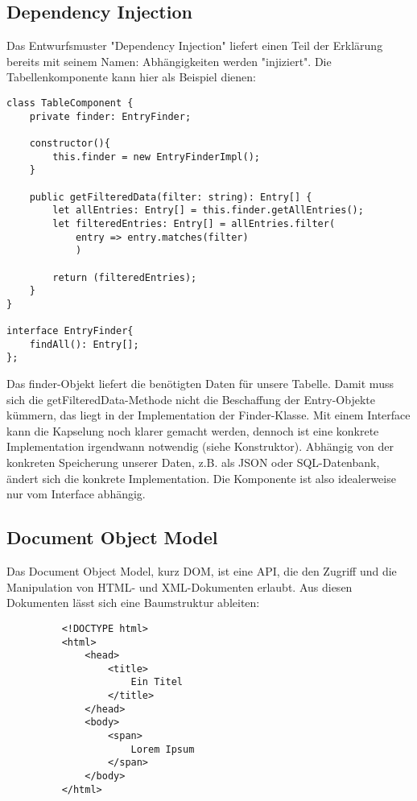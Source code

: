 \subsection{Dependency Injection}
Das Entwurfsmuster "Dependency Injection" liefert einen Teil der Erklärung bereits mit seinem Namen: Abhängigkeiten werden "injiziert". Die Tabellenkomponente kann hier als Beispiel dienen:
\begin{verbatim}
class TableComponent {
    private finder: EntryFinder;

    constructor(){
        this.finder = new EntryFinderImpl();
    }

    public getFilteredData(filter: string): Entry[] {
        let allEntries: Entry[] = this.finder.getAllEntries();
        let filteredEntries: Entry[] = allEntries.filter(
            entry => entry.matches(filter)
            )
        
        return (filteredEntries);
    }
}

interface EntryFinder{
    findAll(): Entry[];
};
\end{verbatim}
Das finder-Objekt liefert die benötigten Daten für unsere Tabelle. Damit muss sich die getFilteredData-Methode nicht die Beschaffung der Entry-Objekte kümmern, das liegt in der Implementation der Finder-Klasse. Mit einem Interface kann die Kapselung noch klarer gemacht werden, dennoch ist eine konkrete Implementation irgendwann notwendig (siehe Konstruktor). Abhängig von der konkreten Speicherung unserer Daten, z.B. als JSON oder SQL-Datenbank, ändert sich die konkrete Implementation. Die Komponente ist also idealerweise nur vom Interface abhängig.

\subsection{Document Object Model}
Das Document Object Model, kurz DOM, ist eine API, die den Zugriff und die Manipulation von HTML- und XML-Dokumenten erlaubt. Aus diesen Dokumenten lässt sich eine Baumstruktur ableiten:

\begin{figure}
    \centering
    \begin{minipage}[c]{0.4\textwidth}
        \begin{verbatim}
    <!DOCTYPE html>
    <html>
        <head>
            <title>
                Ein Titel
            </title>
        </head>
        <body>
            <span>
                Lorem Ipsum
            </span>
        </body>
    </html>
    \end{verbatim}
    \end{minipage}
    \begin{minipage}[c]{0.4\textwidth}
    \end{minipage}
\end{figure}

